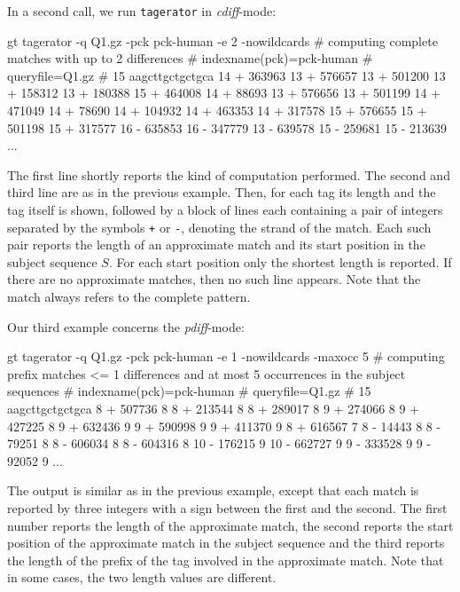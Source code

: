 \documentclass[12pt]{article}
\newcommand{\Program}[0]{\texttt{tagerator}\xspace}
\begin{document}
In a second call, we run \Program in \textit{cdiff}-mode:

\begin{Output}
gt tagerator -q Q1.gz -pck pck-human -e 2 -nowildcards
# computing complete matches with up to 2 differences
# indexname(pck)=pck-human
# queryfile=Q1.gz
# 15 aagcttgctgctgca
14 + 363963
13 + 576657
13 + 501200
13 + 158312
13 + 180388
15 + 464008
14 + 88693
13 + 576656
13 + 501199
14 + 471049
14 + 78690
14 + 104932
14 + 463353
14 + 317578
15 + 576655
15 + 501198
15 + 317577
16 - 635853
16 - 347779
13 - 639578
15 - 259681
15 - 213639
...
\end{Output}
The first line shortly reports the kind of computation performed. The second
and third line are as in the previous example. Then, for
each tag its length and the tag itself is shown, followed by 
a block of lines each containing a pair of integers separated by the
symbols \texttt{+} or \texttt{-}, denoting the strand of the match.
Each such pair reports the length of an approximate match and its start 
position in the subject sequence \(S\). For each
start position only the shortest length is reported. If there are no
approximate matches, then no such line appears. Note that the match always
refers to the complete pattern.

Our third example concerns the \textit{pdiff}-mode:

\begin{Output}
gt tagerator -q Q1.gz -pck pck-human -e 1 -nowildcards -maxocc 5
# computing prefix matches <= 1 differences and at most 5 occurrences in the subject sequences
# indexname(pck)=pck-human
# queryfile=Q1.gz
# 15 aagcttgctgctgca
8 + 507736 8
8 + 213544 8
8 + 289017 8
9 + 274066 8
9 + 427225 8
9 + 632436 9
9 + 590998 9
9 + 411370 9
8 + 616567 7
8 - 14443 8
8 - 79251 8
8 - 606034 8
8 - 604316 8
10 - 176215 9
10 - 662727 9
9 - 333528 9
9 - 92052 9
...
\end{Output}

The output is similar as in the previous example, except that each match
is reported by three integers with a sign between the first and the
second. The first number reports the length of the
approximate match, the second reports the start position of the approximate
match in the subject sequence and the third reports the length of the prefix 
of the tag involved in the approximate match. Note that in some cases,
the two length values are different.
\end{document}
